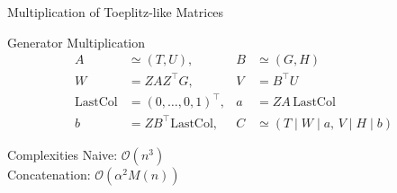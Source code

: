 \begin{frame}{Multiplication of Toeplitz-like Matrices}
  \begin{block}{Generator Multiplication}
    \begin{align*}
      A &\simeq (T, U), & B &\simeq (G, H) \\
      W &= Z A Z^\top G, & V &= B^\top U \\
      \text{LastCol} &= (0, \dots, 0, 1)^\top, & a &= Z A \, \text{LastCol} \\
      b &= Z B^\top \text{LastCol}, & C &\simeq (T \mid W \mid a, \,
      V \mid H \mid b)
    \end{align*}
  \end{block}

  \vspace{1em}

  \begin{block}{Complexities}
    Naive: $\mathcal{O}(n^3)$ \\
    Concatenation: $\mathcal{O}(\alpha^2 M(n))$
  \end{block}
\end{frame}
